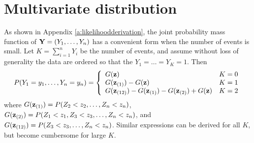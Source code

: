 \documentclass[11pt]{article}
\begin{document}
\section{Multivariate distribution}\label{s:multivariate}
As shown in Appendix \ref{a:likelihoodderivation}, the joint probability mass function of $\mbox{\bf Y}=(Y_1,\ldots,Y_n)$ has a convenient form when the number of events is small.
Let $K=\sum_{i=1}^nY_i$ be the number of events, and assume without loss of generality the data are ordered so that the $Y_1=\ldots=Y_K=1$.
Then
\begin{align}\label{pmf}
  P(Y_1=y_1,\ldots,Y_n=y_n) =  \left\{
    \begin{array}{ll}
      G(\mbox{\bf z}) & K=0 \\
      G(\mbox{\bf z}_{(1)})-G(\mbox{\bf z}) & K=1 \\
      G(\mbox{\bf z}_{(12)})-G(\mbox{\bf z}_{(1)})-G(\mbox{\bf z}_{(2)})+G(\mbox{\bf z}) & K=2
    \end{array}
  \right.
\end{align}
where $G(\mbox{\bf z}_{(1)}) = P(Z_2<z_2,\ldots,Z_n<z_n)$, $G(\mbox{\bf z}_{(2)}) = P(Z_1<z_1,Z_3<z_3,\ldots,Z_n<z_n)$, and $G(\mbox{\bf z}_{(12)}) = P(Z_3<z_3,\ldots,Z_n<z_n)$.
Similar expressions can be derived for all $K$, but become cumbersome for large $K$.
\end{document}
